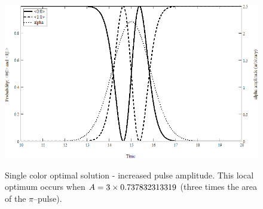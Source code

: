 \begin{figure}
\centering
\includegraphics[width=5.00in]
{big_solution_1/big_solution_1.png}\\
\caption[Single color optimal solution - increased pulse amplitude]{Single color optimal solution - increased pulse amplitude. This local optimum occurs when $A=3\times0.737832313319$ (three times the area of the $\pi$--pulse).}
\label{big solution one}
\end{figure} 
